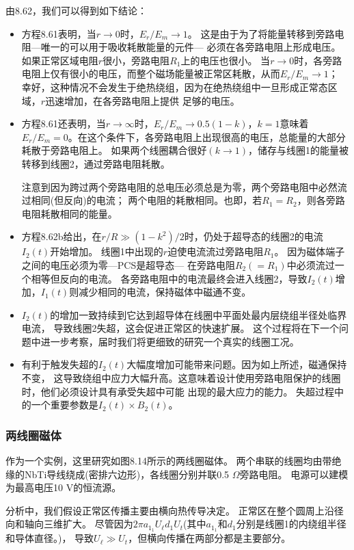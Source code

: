 由8.62，我们可以得到如下结论：
\begin{itemize}
		\item 方程8.61表明，当$r\rightarrow 0$时，$E_r/E_m\rightarrow 1$。
		这是由于为了将能量转移到旁路电阻---唯一的可以用于吸收耗散能量的元件---
		必须在各旁路电阻上形成电压。
		如果正常区域电阻$r$很小，旁路电阻$R_1$上的电压也很小。
		当$r\rightarrow 0$时，各旁路电阻上仅有很小的电压，而整个磁场能量被正常区耗散，从而$E_r/E_m\rightarrow 1$；
		幸好，这种情况不会发生于绝热绕组，因为在绝热绕组中一旦形成正常态区域，$r$迅速增加，在各旁路电阻上提供
		足够的电压。
		\item 方程8.61还表明，当$r\rightarrow\infty$时，$E_r/E_m\rightarrow 0.5(1-k)$，$k=1$意味着
		$E_r/E_m=0$。在这个条件下，各旁路电阻上出现很高的电压，总能量的大部分耗散于旁路电阻上。
		如果两个线圈耦合很好$(k\rightarrow 1)$，储存与线圈1的能量被转移到线圈2，通过旁路电阻耗散。
		
		注意到因为跨过两个旁路电阻的总电压必须总是为零，两个旁路电阻中必然流过相同(但反向)的电流；
		两个电阻的耗散相同。也即，若$R_1=R_2$，则各旁路电阻耗散相同的能量。
		\item 方程8.62b给出，在$r/R\gg (1-k^2)/2$时，仍处于超导态的线圈2的电流$I_2(t)$开始增加。
		线圈1中出现的$r$迫使电流流过旁路电阻$R_1$。
		因为磁体端子之间的电压必须为零---PCS是超导态---
		在旁路电阻$R_2(=R_1)$中必须流过一个相等但反向的电流。
		各旁路电阻中的电流最终会进入线圈2，导致$I_2(t)$增加，$I_1(t)$则减少相同的电流，保持磁体中磁通不变。
		\item $I_2(t)$的增加一致持续到它达到超导体在线圈中平面处最内层绕组半径处临界电流，
		导致线圈2失超，这会促进正常区的快速扩展。
		这个过程将在下一个问题中进一步考察，届时我们将更细致的研究一个真实的线圈工况。
		\item  有利于触发失超的$I_2(t)$大幅度增加可能带来问题。因为如上所述，磁通保持不变，
		这导致绕组中应力大幅升高。这意味着设计使用旁路电阻保护的线圈时，他们必须设计具有承受失超中可能
		出现的最大应力的能力。
		失超过程中的一个重要参数是$I_2(t)\times B_2(t)$。
	\end{itemize}

\subsubsection*{两线圈磁体}
作为一个实例，这里研究如图8.14所示的两线圈磁体。
两个串联的线圈均由带绝缘的NbTi导线绕成(密排六边形)，各线圈分别并联0.5 $\Omega$旁路电阻。
电源可以建模为最高电压10 V的恒流源。

分析中，我们假设正常区传播主要由横向热传导决定。
正常区在整个圆周上沿径向和轴向三维扩大。
尽管因为$2\pi a_{1_1} U_\ell d_1 U_t$(其中$a_{1_1}$和$d_1$分别是线圈1的内绕组半径和导体直径。)，
导致$U_\ell\gg U_t$，但横向传播在两部分都是主要部分。

